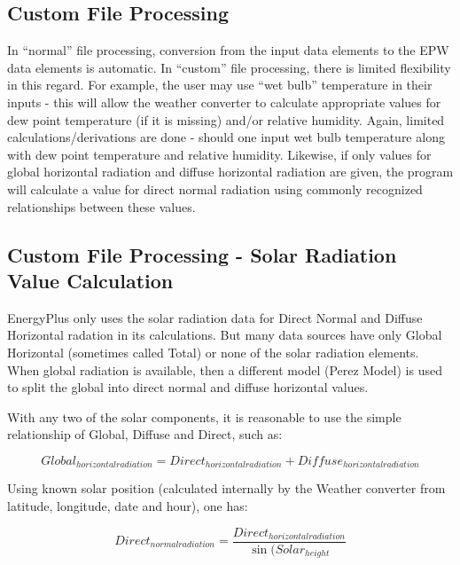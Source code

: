 \subsection{Custom File Processing}\label{custom-file-processing}

In ``normal'' file processing, conversion from the input data elements to the EPW data elements is automatic. In ``custom'' file processing, there is limited flexibility in this regard. For example, the user may use ``wet bulb'' temperature in their inputs - this will allow the weather converter to calculate appropriate values for dew point temperature (if it is missing) and/or relative humidity. Again, limited calculations/derivations are done - should one input wet bulb temperature along with dew point temperature and relative humidity. Likewise, if only values for global horizontal radiation and diffuse horizontal radiation are given, the program will calculate a value for direct normal radiation using commonly recognized relationships between these values.

\subsection{Custom File Processing - Solar Radiation Value Calculation}\label{custom-file-processing---solar-radiation-value-calculation}

EnergyPlus only uses the solar radiation data for Direct Normal and Diffuse Horizontal radation in its calculations. But many data sources have only Global Horizontal (sometimes called Total) or none of the solar radiation elements. When global radiation is available, then a different model (Perez Model) is used to split the global into direct normal and diffuse horizontal values.

With any two of the solar components, it is reasonable to use the simple relationship of Global, Diffuse and Direct, such as:

\begin{equation}
Global_{horizontalradiation} = Direct_{horizontalradiation}+Diffuse_{horizontalradiation}
\end{equation}

Using known solar position (calculated internally by the Weather converter from latitude, longitude, date and hour), one has:

\begin{equation}
Direct_{normalradiation} = \frac{Direct_{horizontalradiation}}{\sin(Solar_{height}}
\end{equation}

